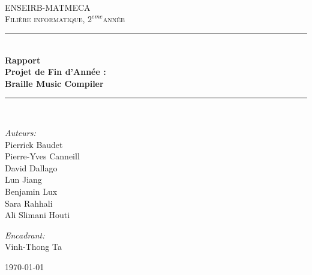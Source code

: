 \documentclass[a4paper
,oneside,11pt]{article}
\def\titre{Rapport\\Projet de Fin d'Année :\\Braille Music Compiler}
\def\filiere{informatique}
\def\annee{$2^{eme}$}  %
\def\equipe{Pierrick Baudet \\ Pierre-Yves Canneill \\ David Dallago \\ Lun Jiang \\ Benjamin Lux \\Sara Rahhali\\Ali Slimani Houti}
\def\encadrant{Vinh-Thong Ta}
\newcommand{\HRule}{\rule{\linewidth}{0.5mm}}
\begin{document}
\begin{titlepage}

\begin{center}


\begin{center}
\end{center}
~\\
~\\
~\\
\textsc{\LARGE ENSEIRB-MATMECA}\\[1cm]

\textsc{\Large {Fili\`ere \filiere, \annee ann\'ee}}\\[0.5cm]

\HRule \\[0.4cm]
{ \huge \bfseries \titre}\\[0.4cm]


\HRule \\[1.5cm]


\begin{minipage}{0.4\textwidth}
\begin{flushleft} \large
\emph{Auteurs:}\\
\equipe
\end{flushleft}
\end{minipage}
\begin{minipage}{0.4\textwidth}
\begin{flushright} \large
\emph{Encadrant:} \\
\encadrant
\end{flushright}
\end{minipage}


\vfill

{\large \today}

\end{center}

\end{titlepage}
\tableofcontents\thispagestyle{fancy}
\newpage
\end{document}
